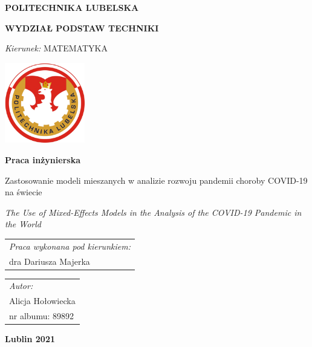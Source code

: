 \documentclass[12pt]{mwbk}
\theoremstyle{plain}
\theoremstyle{definition}
\theoremstyle{definition}
\begin{document}

\thispagestyle{empty}  %


\newcommand\tytul{Zastosowanie modeli mieszanych w analizie rozwoju pandemii choroby COVID-19 na świecie}

\newcommand\tytulangielski{The Use of Mixed-Effects Models in the Analysis of the COVID-19 Pandemic in the World}


\begin{center}


{\large \bf POLITECHNIKA LUBELSKA}

{\bf WYDZIAŁ PODSTAW TECHNIKI}

\emph{Kierunek:} MATEMATYKA


\vfill %
     

\includegraphics[width=3.5cm]{rys/logopl}

\vfill

\textbf{Praca inżynierska}

\vfill
\vfill
\vfill

\large
\tytul

\vfill

\emph{\tytulangielski}


\vfill
\vfill
\vfill
\vfill
\vfill

\begin{tabular}[t]{l}
\emph{Praca wykonana pod kierunkiem:}
\\
dra Dariusza Majerka
\end{tabular}
\hfill
\begin{tabular}[t]{l}
	\emph{Autor:}
\\
Alicja Hołowiecka\\
nr albumu: 89892 
\end{tabular}

\vfill
\vfill
\vfill

\textbf{Lublin 2021}

\end{center}
\end{document}
